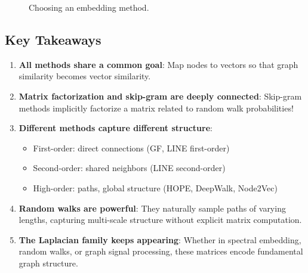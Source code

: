 \begin{notechapter}
\begin{figure}[htbp]
\caption{Choosing an embedding method.}
\end{figure}

\subsection{Key Takeaways}

\begin{keyinsight}
\begin{enumerate}
    \item \textbf{All methods share a common goal}: Map nodes to vectors so that graph similarity becomes vector similarity.
    
    \item \textbf{Matrix factorization and skip-gram are deeply connected}: Skip-gram methods implicitly factorize a matrix related to random walk probabilities!
    
    \item \textbf{Different methods capture different structure}:
    \begin{itemize}
        \item First-order: direct connections (GF, LINE first-order)
        \item Second-order: shared neighbors (LINE second-order)
        \item High-order: paths, global structure (HOPE, DeepWalk, Node2Vec)
    \end{itemize}
    
    \item \textbf{Random walks are powerful}: They naturally sample paths of varying lengths, capturing multi-scale structure without explicit matrix computation.
    
    \item \textbf{The Laplacian family keeps appearing}: Whether in spectral embedding, random walks, or graph signal processing, these matrices encode fundamental graph structure.
\end{enumerate}
\end{keyinsight}


\end{notechapter}
